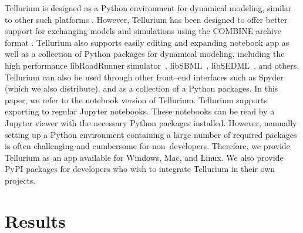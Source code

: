 \documentclass[10pt,letterpaper]{article}
\begin{document}
Tellurium is designed as a Python environment for dynamical modeling, similar to other such platforms \cite{olivier2005modelling}. However, Tellurium has been designed to offer better support for exchanging models and simulations using the COMBINE archive format \cite{bergmann2014combine}. Tellurium also supports easily editing and expanding notebook app as well as a collection of Python packages for dynamical modeling, including the high performance libRoadRunner simulator~\cite{somogyi2015libroadrunner}, libSBML~\cite{bornstein2008libsbml}, libSEDML~\cite{waltemath2011reproducible}, and others. Tellurium can also be used through other front--end interfaces such as Spyder (which we also distribute), and as a collection of a Python packages. In this paper, we refer to the notebook version of Tellurium. Tellurium supports exporting to regular Jupyter notebooks. These notebooks can be read by a Jupyter viewer with the necessary Python packages installed. However, manually setting up a Python environment containing a large number of required packages is often challenging and cumbersome for non--developers. Therefore, we provide Tellurium as an app available for Windows, Mac, and Linux. We also provide PyPI packages for developers who wish to integrate Tellurium in their own projects.




\section*{Results}
\end{document}
